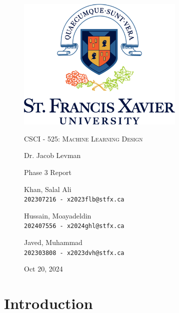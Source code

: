 \documentclass[a4paper,12pt]{article}
\begin{document}
\begin{titlepage}

\begin{figure}[H]
  \centering
  \includegraphics[width=8cm]{../stfx_logo.png}\par
  \vspace{1cm}
  {\scshape\Large CSCI - 525: Machine Learning Design \par}
  \vspace{0.5cm}
  {\large Dr. Jacob Levman \par}
  \vspace{1cm}
  {\Large Phase 3 Report \par}
  \vspace{1cm}
  {\large Khan, Salal Ali\\ \texttt{202307216 - x2023flb@stfx.ca} \par}
  \vspace{0.5cm}
  {\large Hussain, Moayadeldin\\ \texttt{202407556 - x2024ghl@stfx.ca} \par}
  \vspace{0.5cm}
  {\large Javed, Muhammad\\ \texttt{202303808 - x2023dvh@stfx.ca} \par}
  \vfill
  \vspace{0.5cm}
  {\large Oct 20, 2024 \par}
\end{figure}

\end{titlepage}

\section*{Introduction}
\end{document}
